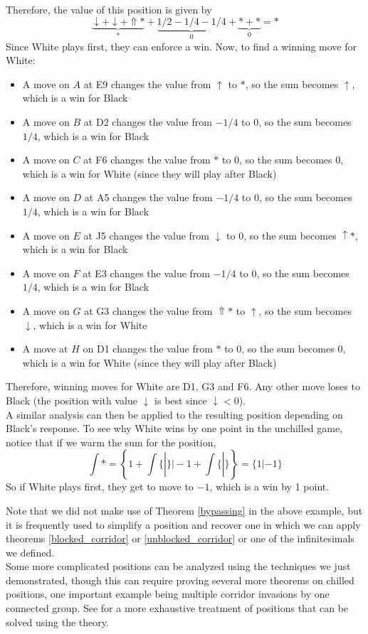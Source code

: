 \documentclass[../math194_paper.tex]{subfiles}
\begin{document}
Therefore, the value of this position is given by 
\[
    \underbrace{\downarrow + \downarrow + \Uparrow*}_{*} + \underbrace{1/2 - 1/4 - 1/4}_{0} +\underbrace{* + *}_{0} = *
\]
Since White plays first, they can enforce a win. Now, to find a winning move for White:
\begin{itemize}
    \item A move on $A$ at E9 changes the value from $\uparrow$ to $*$, so the sum becomes $\uparrow$, which 
    is a win for Black
    \item A move on $B$ at D2 changes the value from $-1/4$ to $0$, so the sum becomes $1/4$, which is a win for Black
    \item A move on $C$ at F6 changes the value from $*$ to $0$, so the sum becomes $0$, which is a win for White 
    (since they will play after Black)
    \item A move on $D$ at A5 changes the value from $-1/4$ to $0$, so the sum becomes $1/4$, which is a win for 
    Black
    \item A move on $E$ at J5 changes the value from $\downarrow$ to $0$, so the sum becomes $\uparrow *$, which 
    is a win for Black
    \item A move on $F$ at E3 changes the value from $-1/4$ to $0$, so the sum becomes $1/4$, which is a win 
    for Black
    \item A move on $G$ at G3 changes the value from $\Uparrow*$ to $\uparrow$, so the sum becomes $\downarrow$,
    which is a win for White
    \item A move at $H$ on D1 changes the value from $*$ to $0$, so the sum becomes $0$, which is a win for 
    White (since they will play after Black)
\end{itemize}
Therefore, winning moves for White are D1, G3 and F6. Any other move loses to Black 
(the position with value $\downarrow$ is best since $\downarrow < 0$). \\
A similar analysis can then be applied to the resulting position depending on Black's response.
To see why White wins by one point in the unchilled game, notice that if we warm the sum for the position,
\[
    \int * = \left\{ 1 + \int \{ | \} \Bigg| -1 + \int \{ | \} \right\} = \{ 1 | -1 \}
\]
So if White plays first, they get to move to $-1$, which is a win by 1 point.

Note that we did not make use of Theorem \ref{bypassing} in the above example, 
but it is frequently used to simplify a position and recover one in which we can 
apply theorems \ref{blocked_corridor} or \ref{unblocked_corridor} or one of the infinitesimals 
we defined. \\

Some more complicated positions can be analyzed using the techniques we just demonstrated, though this
can require proving several more theorems on chilled positions, one important 
example being multiple corridor invasions by one connected group. 
See \cite[\S 4]{berlekamp1994mathematical} for a more exhaustive treatment of
positions that can be solved using the theory.
\end{document}
